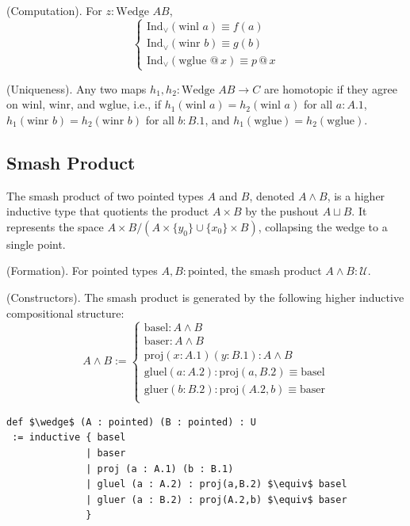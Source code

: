 \documentclass{article}
\begin{document}
\begin{theorem} (Computation).
For \( z : \text{Wedge } A B \),
\[
\begin{cases}
\text{Ind}_\vee(\text{winl } a) \equiv f(a) \\
\text{Ind}_\vee(\text{winr } b) \equiv g(b) \\
\text{Ind}_\vee(\text{wglue } @ \, x) \equiv p \, @ \, x
\end{cases}
\]
\end{theorem}

\begin{theorem} (Uniqueness).
Any two maps \( h_1, h_2 : \text{Wedge } A B \to C \) are homotopic if
they agree on \( \text{winl} \), \( \text{winr} \), and \( \text{wglue} \),
i.e., if \( h_1(\text{winl } a) = h_2(\text{winl } a) \) for
all \( a : A.1 \), \( h_1(\text{winr } b) = h_2(\text{winr } b) \) for
all \( b : B.1 \), and \( h_1(\text{wglue}) = h_2(\text{wglue}) \).
\end{theorem}

\newpage
\subsection{Smash Product}
The smash product of two pointed types \( A \) and \( B \), denoted \( A \wedge B \),
is a higher inductive type that quotients the product \( A \times B \) by
the pushout \( A \sqcup B \). It represents the space \( A \times B / (A \times \{ y_0 \} \cup \{ x_0 \} \times B) \),
collapsing the wedge to a single point.

\begin{definition} (Formation).
For pointed types \( A, B : \text{pointed} \), the smash product \( A \wedge B : \mathcal{U} \).
\end{definition}

\begin{definition} (Constructors).
The smash product is generated by the following higher inductive compositional structure:
\[
A \wedge B :=
\begin{cases}
\text{basel} : A \wedge B \\
\text{baser} : A \wedge B \\
\text{proj} (x: A.1) (y: B.1) : A \wedge B \\
\text{gluel} (a: A.2) : \text{proj}(a,B.2) \equiv \text{basel} \\
\text{gluer} (b: B.2) : \text{proj}(A.2,b) \equiv \text{baser} \\
\end{cases}
\]
\begin{lstlisting}[mathescape=true]
def $\wedge$ (A : pointed) (B : pointed) : U
 := inductive { basel
              | baser
              | proj (a : A.1) (b : B.1)
              | gluel (a : A.2) : proj(a,B.2) $\equiv$ basel
              | gluer (a : B.2) : proj(A.2,b) $\equiv$ baser
              }
\end{lstlisting}
\end{definition}
\end{document}
